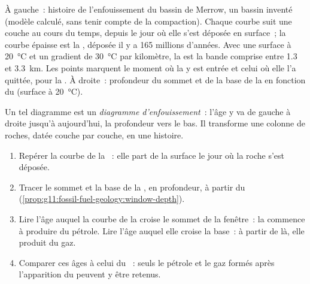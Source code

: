 \begin{omfigure}
{\small À gauche~: histoire de l'enfouissement du bassin de Merrow, un
bassin inventé (modèle calculé, sans tenir compte de la compaction).
Chaque courbe suit une couche au cours du temps, depuis le jour où elle
s'est déposée en surface~; la courbe épaisse est la , déposée il
y a 165 millions d'années. Avec une surface à \qty{20}{\degreeCelsius} et
un gradient de \qty{30}{\degreeCelsius} par kilomètre, la 
est la bande comprise entre \num{1.3} et \qty{3.3}{km}. Les points marquent
le moment où la  y est entrée et celui où elle l'a quittée, pour
la . À droite~: profondeur du sommet et de la base de la
 en fonction du  (surface à
\qty{20}{\degreeCelsius}).}
\end{omfigure}

Un tel diagramme est un \emph{diagramme d'enfouissement}~: l'âge y va de
gauche à droite jusqu'à aujourd'hui, la profondeur vers le bas. Il
transforme une colonne de roches, datée couche par couche, en une histoire.

\begin{method}\label{met:g11:fossil-fuel-geology:burial}
\begin{enumerate}
  \item Repérer la courbe de la ~: elle part de la surface le
        jour où la roche s'est déposée.
  \item Tracer le sommet et la base de la , en profondeur,
        à partir du 
        (\cref{prop:g11:fossil-fuel-geology:window-depth}).
  \item Lire l'âge auquel la courbe de la  croise le sommet de la
        fenêtre~: la  commence à produire du pétrole. Lire l'âge
        auquel elle croise la base~: à partir de là, elle produit du gaz.
  \item Comparer ces âges à celui du ~: seuls le pétrole et le gaz
        formés après l'apparition du  peuvent y être retenus.
\end{enumerate}
\end{method}

